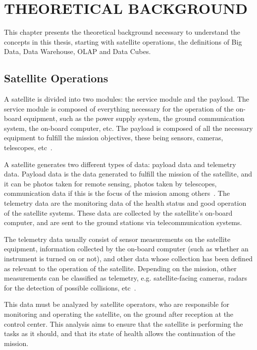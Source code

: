 
\chapter{THEORETICAL BACKGROUND}\label{ch:fun}

This chapter presents the theoretical background necessary to understand the concepts in this thesis, starting with satellite operations, the definitions of Big Data, Data Warehouse, OLAP and Data Cubes.

\section{Satellite Operations}\label{ch:fun:operations}

A satellite is divided into two modules: the service module and the payload.
The service module is composed of everything necessary for the operation of the on-board equipment, such as the power supply system, the ground communication system, the on-board computer, etc.
The payload is composed of all the necessary equipment to fulfill the mission objectives, these being sensors, cameras, telescopes, etc~\cite{larsonSpaceMissionAnalysis1999}.

A satellite generates two different types of data: payload data and telemetry data.
Payload data is the data generated to fulfill the mission of the satellite, and it can be photos taken for remote sensing, photos taken by telescopes, communication data if this is the focus of the mission among others~\cite{larsonSpaceMissionAnalysis1999}.
The telemetry data are the monitoring data of the health status and good operation of the satellite systems. These data are collected by the satellite's on-board computer, and are sent to the ground stations via telecommunication systems.

The telemetry data usually consist of sensor measurements on the satellite equipment, information collected by the on-board computer (such as whether an instrument is turned on or not), and other data whose collection has been defined as relevant to the operation of the satellite.
Depending on the mission, other measurements can be classified as telemetry, e.g. satellite-facing cameras, radars for the detection of possible collisions, etc~\cite{kragCmSpaceDebris2017}.

This data must be analyzed by satellite operators, who are responsible for monitoring and operating the satellite, on the ground after reception at the control center.
This analysis aims to ensure that the satellite is performing the tasks as it should, and that its state of health allows the continuation of the mission.

